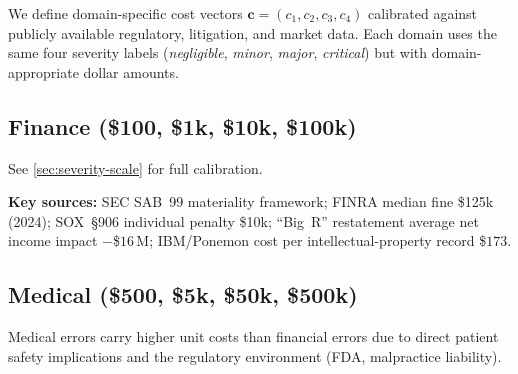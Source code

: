 

We define domain-specific cost vectors $\mathbf{c} = (c_1, c_2, c_3, c_4)$
calibrated against publicly available regulatory, litigation, and
market data. Each domain uses the same four severity labels
(\textit{negligible}, \textit{minor}, \textit{major}, \textit{critical})
but with domain-appropriate dollar amounts.

\subsection{Finance (\$100, \$1k, \$10k, \$100k)}

See \autoref{sec:severity-scale} for full calibration.

\textbf{Key sources:} SEC SAB~99 materiality framework; FINRA median
fine \$125k (2024); SOX~\S906 individual penalty \$10k; \enquote{Big~R}
restatement average net income impact $-$\$$16$\,M; IBM/Ponemon
cost per intellectual-property record \$$173$.

\subsection{Medical (\$500, \$5k, \$50k, \$500k)}

Medical errors carry higher unit costs than financial errors due to
direct patient safety implications and the regulatory environment
(FDA, malpractice liability).

